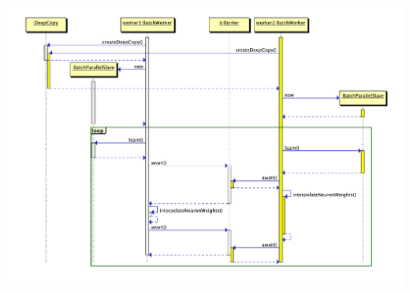 \documentclass[18pt]{beamer}
\begin{document}
\begin{frame}[c,allowframebreaks]
	\framebreak
		\begin{center}
			\includegraphics[scale=0.33]{Grafiken/Batch_seq.pdf}
		\end{center}

	\end{frame}
	
\end{document}
